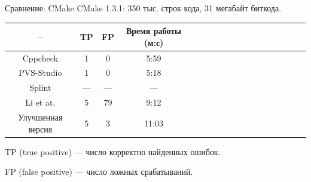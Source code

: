 \documentclass[russian, hyperref={unicode}]{beamer}
\begin{document}
\begin{frame}{Сравнение: CMake}
  CMake 1.3.1: 350 тыс. строк кода, 31 мегабайт биткода.

  \begin{tabular}{|*{18}{c|}}\hline
  --                & TP  & FP  & Время работы (м:с) \\\hline
  Cppcheck          & 1   & 0   & 5:59               \\\hline
  PVS-Studio        & 1   & 0   & 5:18               \\\hline
  Splint            & --- & --- & ---                \\\hline
  Li et at.         & 5   & 79  & 9:12               \\\hline
  Улучшенная версия & 5   & 3   & 11:03              \\\hline
  \end{tabular}

  TP (true positive) --- число корректно найденных ошибок.

  FP (false positive) --- число ложных срабатываний.

\end{frame}
\end{document}
